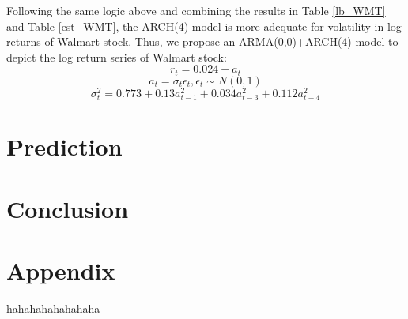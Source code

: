 \documentclass[paper=a4, fontsize=11pt]{article}
\begin{document}
Following the same logic above and combining the results in Table \ref{lb_WMT} and Table \ref{est_WMT}, the ARCH(4) model is more adequate for volatility in log returns of Walmart stock. Thus, we propose an ARMA(0,0)+ARCH(4) model to depict the log return series of Walmart stock:
\[ r_t = 0.024+a_t\]
\[ a_t = \sigma_t \epsilon_t, \epsilon_t \sim N(0,1) \]
\[ \sigma_t^2 = 0.773+0.13a_{t-1}^2+0.034a_{t-3}^2+0.112a_{t-4}^2 \]
\newpage

\section{Prediction}

\section{Conclusion}

\section{Appendix}

\begin{thebibliography}{99}
 hahahahahahahaha
\end{thebibliography}
\end{document}
